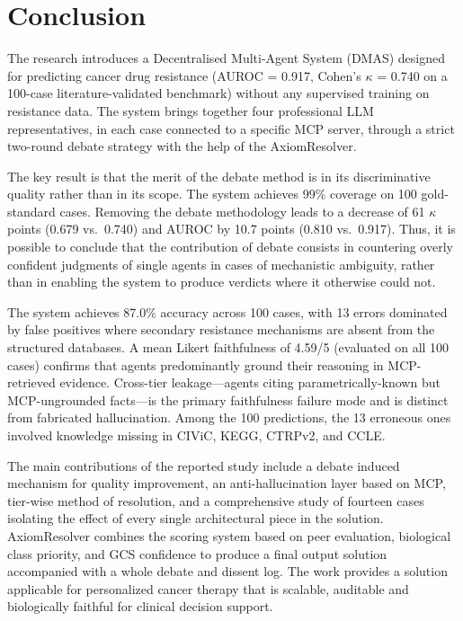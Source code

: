 \documentclass{article}
\begin{document}
\section{Conclusion}
The research introduces a Decentralised Multi-Agent System (DMAS) designed for predicting cancer drug resistance (AUROC = 0.917, Cohen's $\kappa$ = 0.740 on a 100-case literature-validated benchmark) without any supervised training on resistance data. The system brings together four professional LLM representatives, in each case connected to a specific MCP server, through a strict two-round debate strategy with the help of the AxiomResolver.

The key result is that the merit of the debate method is in its discriminative quality rather than in its scope. The system achieves 99\% coverage on 100 gold-standard cases. Removing the debate methodology leads to a decrease of 61 $\kappa$ points (0.679 vs.\ 0.740) and AUROC by 10.7 points (0.810 vs.\ 0.917). Thus, it is possible to conclude that the contribution of debate consists in countering overly confident judgments of single agents in cases of mechanistic ambiguity, rather than in enabling the system to produce verdicts where it otherwise could not.

The system achieves 87.0\% accuracy across 100 cases, with 13 errors dominated by false positives where secondary resistance mechanisms are absent from the structured databases. A mean Likert faithfulness of 4.59/5 (evaluated on all 100 cases) confirms that agents predominantly ground their reasoning in MCP-retrieved evidence. Cross-tier leakage---agents citing parametrically-known but MCP-ungrounded facts---is the primary faithfulness failure mode and is distinct from fabricated hallucination. Among the 100 predictions, the 13 erroneous ones involved knowledge missing in CIViC, KEGG, CTRPv2, and CCLE. 

The main contributions of the reported study include a debate induced mechanism for quality improvement, an anti-hallucination layer based on MCP, tier-wise method of resolution, and a comprehensive study of fourteen cases isolating the effect of every single architectural piece in the solution. AxiomResolver combines the scoring system based on peer evaluation, biological class priority, and GCS confidence to produce a final output solution accompanied with a whole debate and dissent log. The work provides a solution applicable for personalized cancer therapy that is scalable, auditable and biologically faithful for clinical decision support. 
\end{document}
